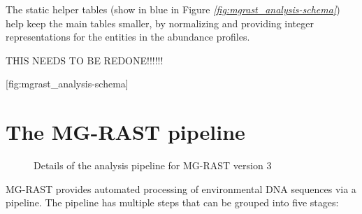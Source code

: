 \documentclass[letterpaper,10pt,english]{sphinxmanual}
\begin{document}
The static helper tables (show in blue in Figure
{\hyperref[\detokenize{user_manual:fig:mgrast_analysis-schema}]{\emph{{[}fig:mgrast\_analysis-schema{]}}}}) help
keep the main tables smaller, by normalizing and providing integer
representations for the entities in the abundance profiles.

THIS NEEDS TO BE REDONE!!!!!!

{[}fig:mgrast\_analysis-schema{]}


\chapter{The MG-RAST pipeline}
\label{\detokenize{user_manual:the-mg-rast-pipeline}}\label{\detokenize{user_manual:section-mgrast-pipeline-details}}
\begin{figure}[htbp]
\centering
\capstart

\noindent{}
\caption{Details of the analysis pipeline for MG-RAST version 3}\label{\detokenize{user_manual:fig-mgrast-v3-pipeline}}\end{figure}

MG-RAST provides automated processing of environmental DNA sequences via
a pipeline. The pipeline has multiple steps that can be grouped into
five stages:
\end{document}
